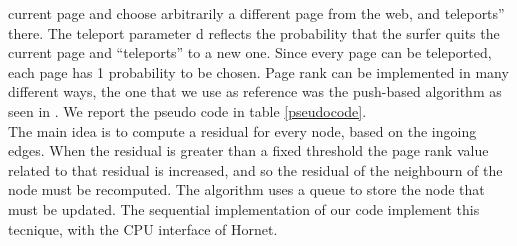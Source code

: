 \documentclass[journal]{IEEEtran}
\begin{document}
current page and choose arbitrarily a different page from the web, and 
teleports” there. The teleport parameter d reflects the probability that the
surfer quits the current page and “teleports” to a new one. Since every page
can be teleported, each page has 1 probability to be chosen.
Page rank can be implemented in many different ways, the one that we use as
reference was the push-based algorithm as seen in \cite{PR}.
We report the pseudo code in table \ref{pseudocode}.\\
The main idea is to compute a residual for every node, based on the ingoing
edges. When the residual is greater than a fixed threshold the
page rank value related to that residual is increased, and so the residual of
the neighbourn of the node must be recomputed. The algorithm uses a queue to
store the node that must be updated.
The sequential implementation of our code implement this tecnique, with the
CPU interface of Hornet.
\end{document}
